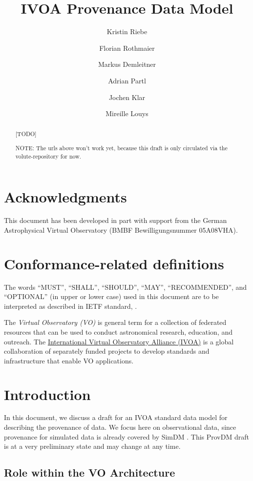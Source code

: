 \documentclass[11pt,a4paper]{ivoa}
\title{IVOA Provenance Data Model}
\author{Kristin Riebe}
\author{Florian Rothmaier}
\author{Markus Demleitner}
\author{Adrian Partl}
\author{Jochen Klar}
\author{Mireille Louys}
\begin{document}
\begin{abstract}
[TODO]

NOTE: The urls above won't work yet, because this draft is only circulated via the volute-repository for now.
\end{abstract}


\section*{Acknowledgments}

This document has been developed in part with support from the German
Astrophysical Virtual Observatory (BMBF Bewilligungsnummer 05A08VHA).



\section*{Conformance-related definitions}

The words ``MUST'', ``SHALL'', ``SHOULD'', ``MAY'', ``RECOMMENDED'', and
``OPTIONAL'' (in upper or lower case) used in this document are to be
interpreted as described in IETF standard, \citet{std:RFC2119}.

The \emph{Virtual Observatory (VO)} is
general term for a collection of federated resources that can be used
to conduct astronomical research, education, and outreach.
The \href{http://www.ivoa.net}{International
Virtual Observatory Alliance (IVOA)} is a global
collaboration of separately funded projects to develop standards and
infrastructure that enable VO applications.


\section{Introduction}

In this document, we discuss a draft for an IVOA standard data model for describing the
provenance of data. We focus here on observational data, since provenance for
simulated data is already covered by SimDM 
\cite{std:SimDM}. This ProvDM draft is at a very preliminary state and may change at any time.


\subsection{Role within the VO Architecture}
\end{document}
